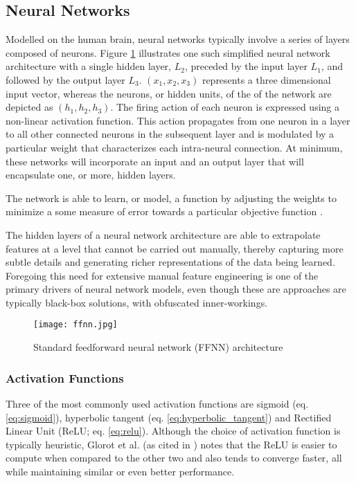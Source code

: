 \documentclass[../../fyp.tex]{subfiles}
\begin{document}
\subsection{Neural Networks}
Modelled on the human brain, neural networks typically involve a series of layers composed of neurons. Figure \ref{fig:ffnn} illustrates one such simplified neural network architecture with a single hidden layer, $L_2$, preceded by the input layer $L_1$, and followed by the output layer $L_3$. $(x_1, x_2, x_3)$ represents a three dimensional input vector, whereas the neurons, or hidden units, of the of the network are depicted as $(h_1, h_2, h_3)$. The firing action of each neuron is expressed using a non-linear activation function. This action propagates from one neuron in a layer to all other connected neurons in the subsequent layer and is modulated by a particular weight that characterizes each intra-neural connection. At minimum, these networks will incorporate an input and an output layer that will encapsulate one, or more, hidden layers.

The network is able to learn, or model, a function by adjusting the weights to minimize a some measure of error towards a particular objective function \cite{graves2012b}.

The hidden layers of a neural network architecture are able to extrapolate features at a level that cannot be carried out manually, thereby capturing more subtle details and generating richer representations of the data being learned. Foregoing this need for extensive manual feature engineering is one of the primary drivers of neural network models, even though these are approaches are typically black-box solutions, with obfuscated inner-workings.

\begin{figure}[!ht]
	\centering
	\texttt{[image: ffnn.jpg]}
	\caption{Standard feedforward neural network (FFNN) architecture \cite{zhang2018}}
	\label{fig:ffnn}
\end{figure}

\subsubsection{Activation Functions}
Three of the most commonly used activation functions are sigmoid (eq. \ref{eq:sigmoid}), hyperbolic tangent (eq. \ref{eq:hyperbolic_tangent}) and Rectified Linear Unit (ReLU; eq. \ref{eq:relu}). Although the choice of activation function is typically heuristic, Glorot et al. \cite{glorot2011} (as cited in \cite{zhang2018}) notes that the ReLU is easier to compute when compared to the other two and also tends to converge faster, all while maintaining similar or even better performance.
\end{document}
